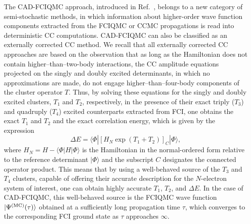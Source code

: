 \documentclass[journal=jcp,manuscript=suppinfo]{achemso}
\begin{document}
The CAD-FCIQMC approach, introduced in Ref.\ , belongs to a new category
of semi-stochastic methods, in which information about higher-order wave function components extracted from
the FCIQMC \cite{piecuch_Booth2009,piecuch_Cleland2010,ghanem_alavi_fciqmc_jcp_2019}
or CCMC \cite{piecuch_Thom2010,piecuch_Franklin2016}
propagations is read into deterministic CC computations.
\cite{piecuch_monte_carlo_cc_prl_2017,piecuch_monte_carlo_cc_jcp_2018,piecuch_monte_carlo_eom_cc_jcp_2019,%
piecuch_monte_carlo_eom_cc_mp_2020}
CAD-FCIQMC can also be classified as an externally corrected CC method.
\cite{piecuch_extcc_1,piecuch_extcc_2,piecuch_extcc_3,piecuch_extcc_4,piecuch_extcc_5,%
piecuch_extcc_6,piecuch_extcc_7,piecuch_extcc_8,piecuch_extcc_9}
We recall that all externally corrected CC approaches are based on the observation that as long as the
Hamiltonian does not contain higher--than--two-body interactions, the CC amplitude equations projected
on the singly and doubly excited determinants, in which no approximations are made, do not engage
higher--than--four-body components of the cluster operator $T$. Thus, by solving these equations for the
singly and doubly excited clusters, $T_{1}$ and $T_{2}$, respectively, in the presence of their exact triply
($T_{3}$) and quadruply ($T_{4}$) excited counterparts extracted from FCI, one obtains the exact
$T_{1}$ and $T_{2}$ and the exact correlation energy, which is given by the expression
\begin{equation}
\Delta E = \langle \Phi | \left[ H_{N} \exp(T_{1} + T_{2}) \right]_{C} |\Phi\rangle ,
\label{eq-cad4}
\end{equation}
where $H_{N} = H - \langle \Phi | H | \Phi \rangle$ is the
Hamiltonian in the normal-ordered form relative to the reference determinant $|\Phi \rangle$
and the subscript $C$ designates the connected operator product. This means that by using a well-behaved
source of the $T_{3}$ and $T_{4}$ clusters, capable of offering their accurate description for the $N$-electron
system of interest, one can obtain
highly accurate $T_{1}$, $T_{2}$, and $\Delta E$. In the case of CAD-FCIQMC, this well-behaved source
is the FCIQMC wave function $|\Psi^{\rm (MC)}(\tau)\rangle$ obtained at a sufficiently long propagation time $\tau$,
which converges to the corresponding FCI ground state as $\tau$ approaches $\infty$.
\end{document}
